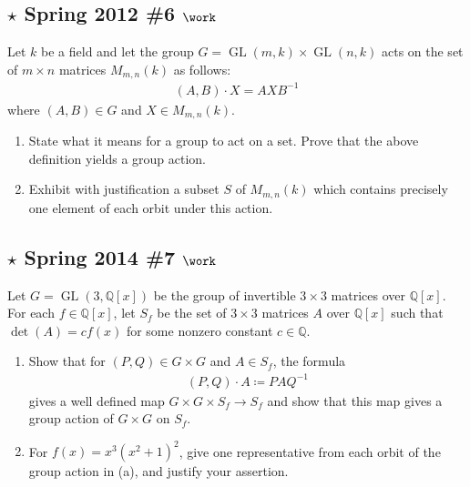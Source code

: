 \hypertarget{star-spring-2012-6-work}{%
\subsection{\texorpdfstring{\(\star\) Spring 2012 \#6
\(\work\)}{\textbackslash star Spring 2012 \#6 \textbackslash work}}\label{star-spring-2012-6-work}}

Let \(k\) be a field and let the group
\(G = \operatorname{GL}(m, k) \times\operatorname{GL}(n, k)\) acts on
the set of \(m\times n\) matrices \(M_{m, n}(k)\) as follows:
\begin{align*}
(A, B) \cdot X = AXB^{-1}
\end{align*}
where \((A, B) \in G\) and \(X\in M_{m, n}(k)\).

\begin{enumerate}
\def\labelenumi{\alph{enumi}.}
\item
  State what it means for a group to act on a set. Prove that the above
  definition yields a group action.
\item
  Exhibit with justification a subset \(S\) of \(M_{m, n}(k)\) which
  contains precisely one element of each orbit under this action.
\end{enumerate}

\hypertarget{star-spring-2014-7-work}{%
\subsection{\texorpdfstring{\(\star\) Spring 2014 \#7
\(\work\)}{\textbackslash star Spring 2014 \#7 \textbackslash work}}\label{star-spring-2014-7-work}}

Let \(G = \operatorname{GL}(3, {\mathbb{Q}}[x])\) be the group of
invertible \(3\times 3\) matrices over \({\mathbb{Q}}[x]\). For each
\(f\in {\mathbb{Q}}[x]\), let \(S_f\) be the set of \(3\times 3\)
matrices \(A\) over \({\mathbb{Q}}[x]\) such that \(\det(A) = c f(x)\)
for some nonzero constant \(c\in {\mathbb{Q}}\).

\begin{enumerate}
\def\labelenumi{\alph{enumi}.}
\item
  Show that for \((P, Q) \in G\times G\) and \(A\in S_f\), the formula
  \begin{align*}
  (P, Q)\cdot A \coloneqq PAQ^{-1}
  \end{align*}
  gives a well defined map \(G\times G \times S_f \to S_f\) and show
  that this map gives a group action of \(G\times G\) on \(S_f\).
\item
  For \(f(x) = x^3(x^2+1)^2\), give one representative from each orbit
  of the group action in (a), and justify your assertion.
\end{enumerate}


